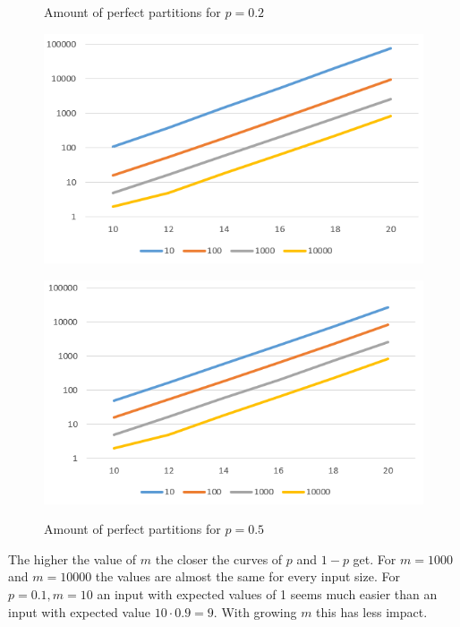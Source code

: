 \begin{figure}[h]
      \centering
      \begin{minipage}[b]{0.45\textwidth}
            \caption{Amount of perfect partitions for $p=0.2$}
            \includegraphics[width=\textwidth]{figures/images/solvabilityOfInputs/perfectPartitionCount-p0_2.png}
      \end{minipage}
      \hspace{0.75cm}
      \begin{minipage}[b]{0.45\textwidth}
            \caption{Amount of perfect partitions for $p=0.5$}
            \includegraphics[width=\textwidth]{figures/images/solvabilityOfInputs/perfectPartitionCount-p0_8.png}\label{fig:lastBinSolCount}
      \end{minipage}
\end{figure}

The higher the value of $m$ the closer the curves of $p$ and $1-p$ get.
For $m=1000$ and $m=10000$ the values are almost the same for every input size.
For $p=0.1, m=10$ an input with expected values of 1 seems much easier than an input with expected value $10\cdot0.9=9$.
With growing $m$ this has less impact.

